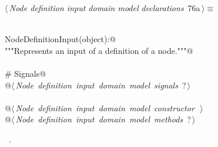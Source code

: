 \documentclass[
    a4paper,      %
    10pt,         %
    openright,    %
    notitlepage,  %
    parskip=half, %
]{scrreprt}       %
\theoremstyle{definition}                    %
\begin{document}
\begin{flushleft} \small
\begin{minipage}{\linewidth}\label{scrap124}\raggedright\small
{} $\langle\,${\itshape Node definition input domain model declarations}\nobreak\ {\footnotesize {76a}}$\,\rangle\equiv$
\vspace{-1exm}
\begin{list}{}{} \item
\mbox{}\lstinline@@\\
\mbox{}\lstinline@class NodeDefinitionInput(object):@\\
\mbox{}\lstinline@    """Represents an input of a definition of a node."""@\\
\mbox{}\lstinline@@\\
\mbox{}\lstinline@    # Signals@\\
\mbox{}\lstinline@    @\hbox{$\langle\,${\itshape Node definition input domain model signals}\nobreak\ {\footnotesize ?}$\,\rangle$}\lstinline@@\\
\mbox{}\lstinline@@\\
\mbox{}\lstinline@    @\hbox{$\langle\,${\itshape Node definition input domain model constructor}\nobreak\ {\footnotesize {}}$\,\rangle$}\lstinline@@\\
\mbox{}\lstinline@    @\hbox{$\langle\,${\itshape Node definition input domain model methods}\nobreak\ {\footnotesize ?}$\,\rangle$}\lstinline@@{\NWsep}
\end{list}
\vspace{-1.5ex}
\footnotesize
\begin{list}{}{\setlength{\itemsep}{-\parsep}\setlength{\itemindent}{-\leftmargin}}
\item \NWtxtMacroRefIn\ .

\item{}
\end{list}
\end{minipage}\vspace{4ex}
\end{flushleft}
\end{document}
